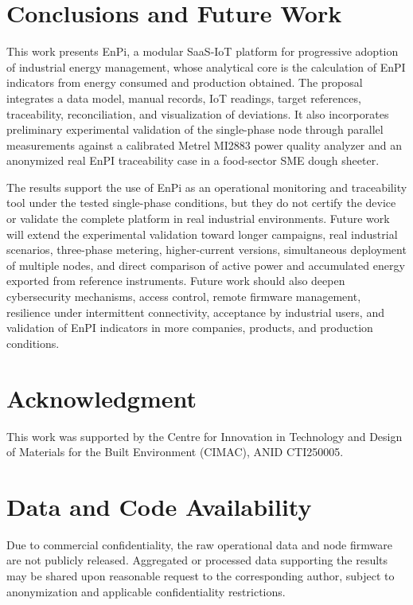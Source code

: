 \documentclass{ieeeaccess}
\begin{document}
\section{Conclusions and Future Work}
\label{sec:conclusions}

This work presents EnPi, a modular SaaS-IoT platform for progressive adoption of industrial energy management, whose analytical core is the calculation of EnPI indicators from energy consumed and production obtained. The proposal integrates a data model, manual records, IoT readings, target references, traceability, reconciliation, and visualization of deviations. It also incorporates preliminary experimental validation of the single-phase node through parallel measurements against a calibrated Metrel MI2883 power quality analyzer and an anonymized real EnPI traceability case in a food-sector SME dough sheeter.

The results support the use of EnPi as an operational monitoring and traceability tool under the tested single-phase conditions, but they do not certify the device or validate the complete platform in real industrial environments. Future work will extend the experimental validation toward longer campaigns, real industrial scenarios, three-phase metering, higher-current versions, simultaneous deployment of multiple nodes, and direct comparison of active power and accumulated energy exported from reference instruments. Future work should also deepen cybersecurity mechanisms, access control, remote firmware management, resilience under intermittent connectivity, acceptance by industrial users, and validation of EnPI indicators in more companies, products, and production conditions.

\section*{Acknowledgment}
This work was supported by the Centre for Innovation in Technology and Design of Materials for the Built Environment (CIMAC), ANID CTI250005.

\section*{Data and Code Availability}

Due to commercial confidentiality, the raw operational data and node firmware are not publicly released. Aggregated or processed data supporting the results may be shared upon reasonable request to the corresponding author, subject to anonymization and applicable confidentiality restrictions.
\end{document}
